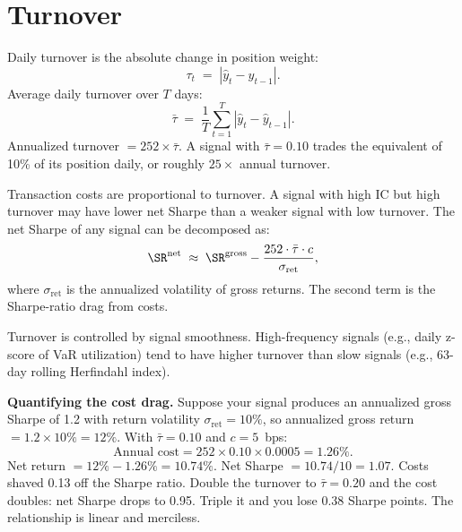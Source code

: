 \section{Turnover}
\label{sec:turnover}

\begin{definition}[Turnover]
Daily turnover is the absolute change in position weight:
\begin{equation}
\label{eq:turnover}
\tau_t \;=\; |\hat{y}_t - \hat{y}_{t-1}|.
\end{equation}
Average daily turnover over $T$ days:
\begin{equation}
\label{eq:avg-turnover}
\bar{\tau} \;=\; \frac{1}{T}\sum_{t=1}^{T} |\hat{y}_t - \hat{y}_{t-1}|.
\end{equation}
Annualized turnover $= 252 \times \bar{\tau}$.  A signal with $\bar{\tau} = 0.10$ trades the equivalent of 10\% of its position daily, or roughly $25\times$ annual turnover.
\end{definition}

\begin{prereq}
Transaction costs are proportional to turnover.  A signal with high IC but high turnover may have lower net Sharpe than a weaker signal with low turnover.  The net Sharpe of any signal can be decomposed as:
\[
\SR^{\text{net}} \;\approx\; \SR^{\text{gross}} - \frac{252 \cdot \bar{\tau} \cdot c}{\sigma_{\text{ret}}},
\]
where $\sigma_{\text{ret}}$ is the annualized volatility of gross returns.  The second term is the Sharpe-ratio drag from costs.
\end{prereq}

Turnover is controlled by signal smoothness.  High-frequency signals (e.g., daily z-score of VaR utilization) tend to have higher turnover than slow signals (e.g., 63-day rolling Herfindahl index).

\textbf{Quantifying the cost drag.}  Suppose your signal produces an annualized gross Sharpe of 1.2 with return volatility $\sigma_{\text{ret}} = 10\%$, so annualized gross return $= 1.2 \times 10\% = 12\%$.  With $\bar{\tau} = 0.10$ and $c = 5$~bps:
\[
\text{Annual cost} = 252 \times 0.10 \times 0.0005 = 1.26\%.
\]
Net return $= 12\% - 1.26\% = 10.74\%$.  Net Sharpe $= 10.74/10 = 1.07$.  Costs shaved 0.13 off the Sharpe ratio.  Double the turnover to $\bar{\tau} = 0.20$ and the cost doubles: net Sharpe drops to 0.95.  Triple it and you lose 0.38 Sharpe points.  The relationship is linear and merciless.

